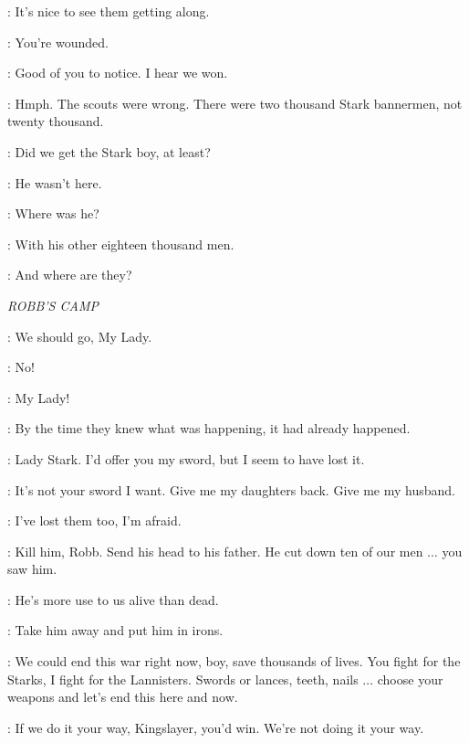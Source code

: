 
\TYRION: It's nice to see them getting along. 


\TYWIN: You're wounded. 

\TYRION: Good of you to notice. I hear we won. 

\TYWIN: Hmph. The scouts were wrong. There were two thousand Stark bannermen, not twenty thousand. 

\TYRION: Did we get the Stark boy, at least? 

\TYWIN: He wasn't here. 

\TYRION: Where was he? 

\TYWIN: With his other eighteen thousand men. 

\TYRION: And where are they? 


\scene

\textit{ROBB'S CAMP} 


\RODRIK: We should go, My Lady. 

\CATELYN: No! 

\RODRIK: My Lady! 


\ROBB: By the time they knew what was happening, it had already happened. 

\JAIME: Lady Stark. I'd offer you my sword, but I seem to have lost it. 

\CATELYN: It's not your sword I want. Give me my daughters back. Give me my husband. 

\JAIME: I've lost them too, I'm afraid. 

\THEON: Kill him, Robb. Send his head to his father. He cut down ten of our men $\ldots$ you saw him. 

\ROBB: He's more use to us alive than dead. 

\CATELYN: Take him away and put him in irons. 

\JAIME: We could end this war right now, boy, save thousands of lives. You fight for the Starks, I fight for the Lannisters. Swords or lances, teeth, nails $\ldots$ choose your weapons and let's end this here and now. 

\ROBB: If we do it your way, Kingslayer, you'd win. We're not doing it your way. 

